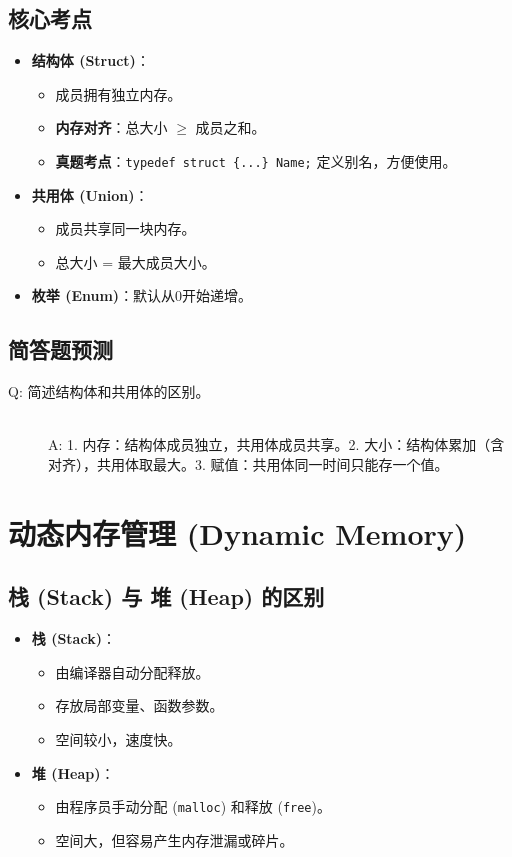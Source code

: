 \documentclass[a4paper,12pt]{article}
\begin{document}
\subsection{核心考点}
\begin{itemize}
    \item \textbf{结构体 (Struct)}：
    \begin{itemize}
        \item 成员拥有独立内存。
        \item \textbf{内存对齐}：总大小 $\ge$ 成员之和。
        \item \textbf{真题考点}：\texttt{typedef struct \{...\} Name;} 定义别名，方便使用。
    \end{itemize}
    \item \textbf{共用体 (Union)}：
    \begin{itemize}
        \item 成员共享同一块内存。
        \item 总大小 = 最大成员大小。
    \end{itemize}
    \item \textbf{枚举 (Enum)}：默认从0开始递增。
\end{itemize}

\subsection{简答题预测}
\begin{description}
    \item[Q: 简述结构体和共用体的区别。] \hfill \\
    A: 1. 内存：结构体成员独立，共用体成员共享。2. 大小：结构体累加（含对齐），共用体取最大。3. 赋值：共用体同一时间只能存一个值。
\end{description}

\section{动态内存管理 (Dynamic Memory)}

\subsection{栈 (Stack) 与 堆 (Heap) 的区别}
\begin{itemize}
    \item \textbf{栈 (Stack)}：
    \begin{itemize}
        \item 由编译器自动分配释放。
        \item 存放局部变量、函数参数。
        \item 空间较小，速度快。
    \end{itemize}
    \item \textbf{堆 (Heap)}：
    \begin{itemize}
        \item 由程序员手动分配 (\texttt{malloc}) 和释放 (\texttt{free})。
        \item 空间大，但容易产生内存泄漏或碎片。
    \end{itemize}
\end{itemize}
\end{document}
